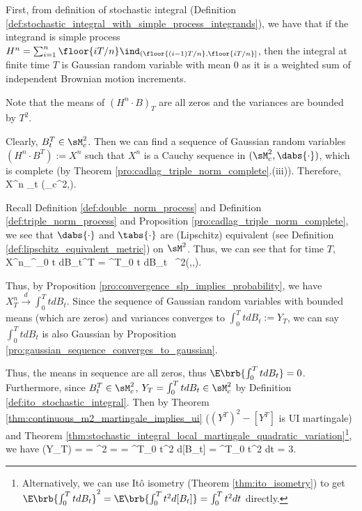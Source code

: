 \begin{solution}[\bf Solution]%
First, from definition of stochastic integral (Definition \ref{def:stochastic_integral_with_simple_process_integrands}),
we have that if the integrand is simple process $H^n = \sum^{n}_{i=1} \floor{iT/n}\ind_{(\floor{(i-1)T/n}, \floor{iT/n}]}$,
then the integral at finite time $T$ is Gaussian random variable with mean 0 as it is a weighted sum of independent Brownian motion increments.

Note that the means of $(H^n \cdot B)_T$ are all zeros and the variances are bounded by $T^2$.

Clearly, $B_t^T \in \sM_c^2$. Then we can find a sequence of Gaussian random variables $(H^n\cdot B^T) := X^n$ such that $X^n$ is a Cauchy sequence in $(\sM^2_c , \dabs{\cdot})$, which is complete (by Theorem \ref{pro:cadlag_triple_norm_complete}.(iii)). Therefore,
\be
X^n \to {}_{t} \quad {}(\sM_c^2,\dabs{\cdot}).
\ee

Recall Definition
\ref{def:double_norm_process} and Definition \ref{def:triple_norm_process} and Proposition \ref{pro:cadlag_triple_norm_complete}, we see that $\dabs{\cdot}$ and $\tabs{\cdot}$ are (Lipschitz) equivalent (see Definition
\ref{def:lipschitz_equivalent_metric}) on $\sM^2$. Thus, we can see that for time $T$, \be X^n_\infty \to \int^{\infty}_0 t dB_t^T = \int^T_0 t dB_t \ \sL^2(\Omega,\sF,\pro). \ee

Thus, by Proposition \ref{pro:convergence_slp_implies_probability}, we have $X^n_T \stackrel{d}{\to} \int^T_0 t dB_t$. Since the sequence of Gaussian random variables with bounded means (which are zeros) and variances
converges to $\int^T_0 t dB_t := Y_T$, we can say $\int^T_0 t dB_t$ is also Gaussian by Proposition \ref{pro:gaussian_sequence_converges_to_gaussian}.

Thus, the means in sequence are all zeros, thus $\E\brb{\int^T_0 t dB_t} = 0$. Furthermore, since $B_t^T \in \sM_c^2$, $Y_T = \int^T_0 t dB_t \in \sM_c^2$ by Definition \ref{def:ito_stochastic_integral}.
Then by Theorem \ref{thm:continuous_m2_martingale_implies_ui} ($(Y^T)^2 - [Y^T]$ is UI martingale) and Theorem \ref{thm:stochastic_integral_local_martingale_quadratic_variation}\footnote{Alternatively, we can use It\^o isometry (Theorem \ref{thm:ito_isometry}) to get $\E\brb{\int^T_0 t dB_t}^2 = \E\brb{\int^T_0 t^2 d[B_t]} = \int^T_0 t^2 dt$ directly.}, we have %
\be
\var(Y_T) = \var{} = \E{}^2 =  =  \int^T_0 t^2 d[B_t] = \int^T_0 t^2 dt = 3.
\ee


\end{solution}
